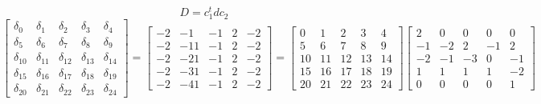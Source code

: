 \documentclass{article}%
\begin{document}
\[%
D = c_1^t d c_2%
\]%
\[%
\left[\begin{matrix}\delta_{0} & \delta_{1} & \delta_{2} & \delta_{3} & \delta_{4}\\\delta_{5} & \delta_{6} & \delta_{7} & \delta_{8} & \delta_{9}\\\delta_{10} & \delta_{11} & \delta_{12} & \delta_{13} & \delta_{14}\\\delta_{15} & \delta_{16} & \delta_{17} & \delta_{18} & \delta_{19}\\\delta_{20} & \delta_{21} & \delta_{22} & \delta_{23} & \delta_{24}\end{matrix}\right] = \left[\begin{matrix}-2 & -1 & -1 & 2 & -2\\-2 & -11 & -1 & 2 & -2\\-2 & -21 & -1 & 2 & -2\\-2 & -31 & -1 & 2 & -2\\-2 & -41 & -1 & 2 & -2\end{matrix}\right] = \left[\begin{matrix}0 & 1 & 2 & 3 & 4\\5 & 6 & 7 & 8 & 9\\10 & 11 & 12 & 13 & 14\\15 & 16 & 17 & 18 & 19\\20 & 21 & 22 & 23 & 24\end{matrix}\right] \left[\begin{matrix}2 & 0 & 0 & 0 & 0\\-1 & -2 & 2 & -1 & 2\\-2 & -1 & -3 & 0 & -1\\1 & 1 & 1 & 1 & -2\\0 & 0 & 0 & 0 & 1\end{matrix}\right]%
\]%
\end{document}
